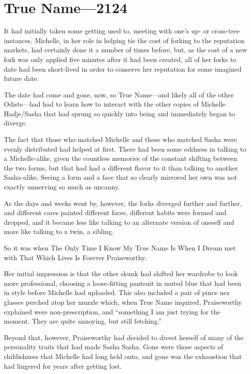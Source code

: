 \hypertarget{true-name-2124}{%
\chapter{True Name—2124}\label{true-name-2124}}

It had initially taken some getting used to, meeting with one's up- or cross-tree instances. Michelle, in her role in helping tie the cost of forking to the reputation markets, had certainly done it a number of times before, but, as the cost of a new fork was only applied five minutes after it had been created, all of her forks to date had been short-lived in order to conserve her reputation for some imagined future date.

The date had come and gone, now, so True Name---and likely all of the other Odists---had had to learn how to interact with the other copies of Michelle Hadje/Sasha that had sprung so quickly into being and immediately began to diverge.

The fact that those who matched Michelle and those who matched Sasha were evenly distributed had helped at first. There had been some oddness in talking to a Michelle-alike, given the countless memories of the constant shifting between the two forms, but that had had a different flavor to it than talking to another Sasha-alike. Seeing a form and a face that so clearly mirrored her own was not exactly unnerving so much as uncanny.

As the days and weeks went by, however, the forks diverged further and further, and different cares painted different faces, different habits were formed and dropped, and it became less like talking to an alternate version of oneself and more like talking to a twin, a sibling.

So it was when The Only Time I Know My True Name Is When I Dream met with That Which Lives Is Forever Praiseworthy.

Her initial impression is that the other skunk had shifted her wardrobe to look more professional, choosing a loose-fitting pantsuit in muted blue that had been in style before Michelle had uploaded. This also included a pair of pince nez glasses perched atop her muzzle which, when True Name inquired, Praiseworthy explained were non-prescription, and ``something I am just trying for the moment. They are quite annoying, but still fetching.''

Beyond that, however, Praiseworthy had decided to divest herself of many of the personality traits that had made Sasha Sasha. Gone were those aspects of childishness that Michelle had long held onto, and gone was the exhaustion that had lingered for years after getting lost.

